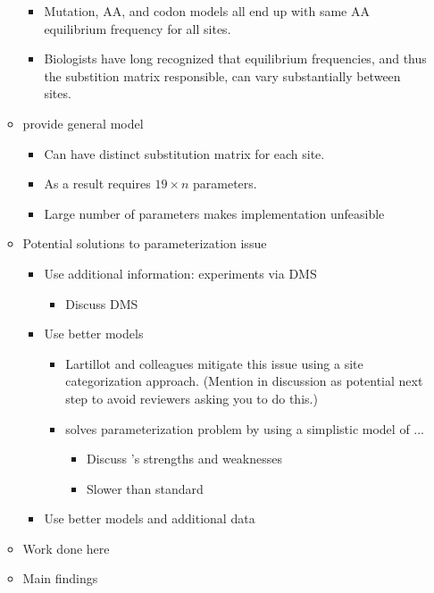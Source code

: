 \documentclass[12pt]{article}
\begin{document}
\begin{itemize}
\begin{itemize}
\begin{itemize}
\begin{itemize}
      \end{itemize}
    \item Mutation, AA, and codon models all end up with same AA equilibrium frequency for all sites.
    \item Biologists have long recognized that equilibrium frequencies, and thus the substition matrix responsible, can vary substantially between sites.
    \end{itemize}
  \item \citet{HalpernAndBruno1998} provide general model
    \begin{itemize}
    \item Can have distinct substitution matrix for each site.
    \item As a result requires $19 \times n$ parameters.
    \item Large number of parameters makes implementation unfeasible
    \end{itemize}
  \item Potential solutions to parameterization issue
    \begin{itemize}
    \item Use additional information: experiments via DMS
      \begin{itemize}
      \item Discuss DMS
      \end{itemize}
    \item Use better models
      \begin{itemize}
      \item Lartillot and colleagues mitigate this issue using a site categorization approach. (Mention in discussion as potential next step to avoid reviewers asking you to do this.)
      \item \SelAC solves parameterization problem by using a simplistic model of ...
        \begin{itemize}
        \item Discuss \SelAC's strengths and weaknesses
        \item Slower than standard
        \end{itemize}        
      \end{itemize}
    \item Use better models and additional data
    \end{itemize}
  \item Work done here
  \item Main findings
  \end{itemize}
\end{itemize}
\end{document}
